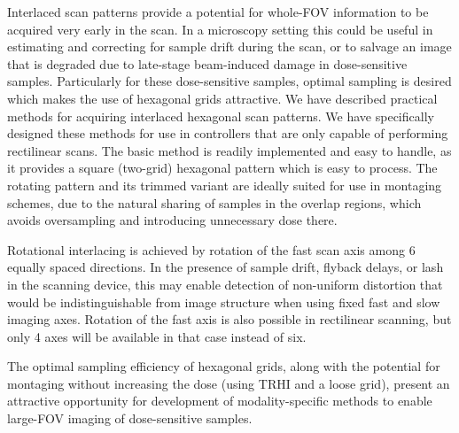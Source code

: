 \documentclass[aip, amsmath, amssymb, nobibnotes, nofootinbib, citeautoscript, reprint, superscriptaddress]{revtex4-1}
\begin{document}
    Interlaced scan patterns provide a potential for whole-FOV information to be acquired very early in the scan.
    In a microscopy setting this could be useful in estimating and correcting for sample drift during the scan, or to salvage an image that is degraded due to late-stage beam-induced damage in dose-sensitive samples.
    Particularly for these dose-sensitive samples, optimal sampling is desired which makes the use of hexagonal grids attractive.
    We have described practical methods for acquiring interlaced hexagonal scan patterns.
    We have specifically designed these methods for use in controllers that are only
    capable of performing rectilinear scans.
    The basic method is readily implemented and easy to handle, as it provides a square (two-grid) hexagonal pattern which is easy to process.
    The rotating pattern and its trimmed variant are ideally suited for use in montaging schemes, due to the natural sharing of samples in the overlap regions, which avoids oversampling and introducing unnecessary dose there.


    Rotational interlacing is achieved by rotation of the fast scan axis among 6
    equally spaced directions.
    In the presence of sample drift, flyback delays, or lash in the scanning device,
    this may enable detection of non-uniform distortion that would be
    indistinguishable from image structure when using fixed fast and slow imaging
    axes.
    Rotation of the fast axis is also possible in rectilinear scanning, but only 4
    axes will be available in that case instead of six.


    The optimal sampling efficiency of hexagonal grids, along with the potential for
    montaging without increasing the dose (using TRHI and a loose grid), present an
    attractive opportunity for development of modality-specific methods to enable
    large-FOV imaging of dose-sensitive samples.

    
\end{document}
